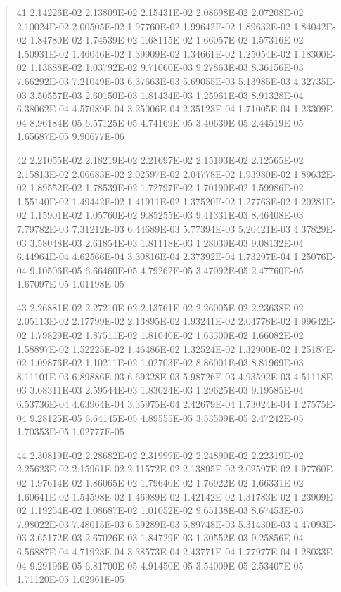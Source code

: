 \documentclass[letterpaper,10pt,english]{sphinxmanual}
\begin{document}
\begin{quote}
\begin{DUlineblock}{0em}
\item[] 41   2.14226E-02  2.13809E-02  2.15431E-02  2.08698E-02  2.07208E-02  2.10024E-02  2.00505E-02  1.97760E-02  1.99642E-02  1.89632E-02  1.84042E-02  1.84780E-02  1.74539E-02  1.68115E-02  1.66057E-02  1.57316E-02  1.50931E-02  1.46046E-02  1.39909E-02  1.34661E-02  1.25054E-02  1.18300E-02  1.13888E-02  1.03792E-02  9.71060E-03  9.27863E-03  8.36156E-03  7.66292E-03  7.21049E-03  6.37663E-03  5.69055E-03  5.13985E-03  4.32735E-03  3.50557E-03  2.60150E-03  1.81434E-03  1.25961E-03  8.91328E-04  6.38062E-04  4.57089E-04  3.25006E-04  2.35123E-04  1.71005E-04  1.23309E-04  8.96184E-05  6.57125E-05  4.74169E-05  3.40639E-05  2.44519E-05  1.65687E-05  9.90677E-06
\item[] 42   2.21055E-02  2.18219E-02  2.21697E-02  2.15193E-02  2.12565E-02  2.15813E-02  2.06683E-02  2.02597E-02  2.04778E-02  1.93980E-02  1.89632E-02  1.89552E-02  1.78539E-02  1.72797E-02  1.70190E-02  1.59986E-02  1.55140E-02  1.49442E-02  1.41911E-02  1.37520E-02  1.27763E-02  1.20281E-02  1.15901E-02  1.05760E-02  9.85255E-03  9.41331E-03  8.46408E-03  7.79782E-03  7.31212E-03  6.44689E-03  5.77394E-03  5.20421E-03  4.37829E-03  3.58048E-03  2.61854E-03  1.81118E-03  1.28030E-03  9.08132E-04  6.44964E-04  4.62566E-04  3.30816E-04  2.37392E-04  1.73297E-04  1.25076E-04  9.10506E-05  6.66460E-05  4.79262E-05  3.47092E-05  2.47760E-05  1.67097E-05  1.01198E-05
\item[] 43   2.26881E-02  2.27210E-02  2.13761E-02  2.26005E-02  2.23638E-02  2.05113E-02  2.17799E-02  2.13895E-02  1.93241E-02  2.04778E-02  1.99642E-02  1.79829E-02  1.87511E-02  1.81040E-02  1.63300E-02  1.66082E-02  1.58897E-02  1.52225E-02  1.46486E-02  1.32524E-02  1.32900E-02  1.25187E-02  1.09876E-02  1.10211E-02  1.02703E-02  8.86001E-03  8.81969E-03  8.11101E-03  6.89886E-03  6.69328E-03  5.98726E-03  4.93592E-03  4.51118E-03  3.68311E-03  2.59544E-03  1.83024E-03  1.29625E-03  9.19585E-04  6.53736E-04  4.63964E-04  3.35975E-04  2.42679E-04  1.73024E-04  1.27575E-04  9.28125E-05  6.64145E-05  4.89555E-05  3.53509E-05  2.47242E-05  1.70353E-05  1.02777E-05
\item[] 44   2.30819E-02  2.28682E-02  2.31999E-02  2.24890E-02  2.22319E-02  2.25623E-02  2.15961E-02  2.11572E-02  2.13895E-02  2.02597E-02  1.97760E-02  1.97614E-02  1.86065E-02  1.79640E-02  1.76922E-02  1.66331E-02  1.60641E-02  1.54598E-02  1.46989E-02  1.42142E-02  1.31783E-02  1.23909E-02  1.19254E-02  1.08687E-02  1.01052E-02  9.65138E-03  8.67453E-03  7.98022E-03  7.48015E-03  6.59289E-03  5.89748E-03  5.31430E-03  4.47093E-03  3.65172E-03  2.67026E-03  1.84729E-03  1.30552E-03  9.25856E-04  6.56887E-04  4.71923E-04  3.38573E-04  2.43771E-04  1.77977E-04  1.28033E-04  9.29196E-05  6.81700E-05  4.91450E-05  3.54009E-05  2.53407E-05  1.71120E-05  1.02961E-05

\end{DUlineblock}
\end{quote}
\end{document}
